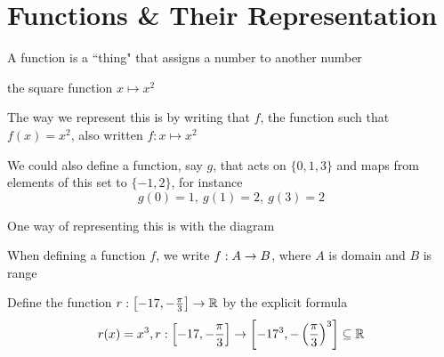 \chapter{Functions \& Their Representation}
A function is a ``thing" that assigns a number to another number
\begin{example*}
    the square function $x \mapsto x^2$ 

    The way we represent this is by writing that $f$, the function such that $f(x)=x^2$, also written $f:x\mapsto x^2$
\end{example*}
\begin{example*}
    We could also define a function, say $g$, that acts on $\{0, 1, 3\}$ and maps from elements of this set to $\{-1,2\}$, for instance
    $$g(0) = 1,\ g(1) = 2,\ g(3) = 2$$
\end{example*}
One way of representing this is with the diagram

\begin{center}
\end{center}

When defining a function $f$, we write $f:A\rightarrow B$, where $A$ is domain and $B$ is range

\begin{example*}
    Define the function $r:\left[-17,-\frac{\pi}{3}\right] \rightarrow \mathbb R$ by the explicit formula $$r(x)=x^3,r:\left[-17,-\frac{\pi}{3}\right] \rightarrow \left[-17^3,-\left(\frac{\pi}{3}\right)^3\right] \subseteq \mathbb R$$
\end{example*}

